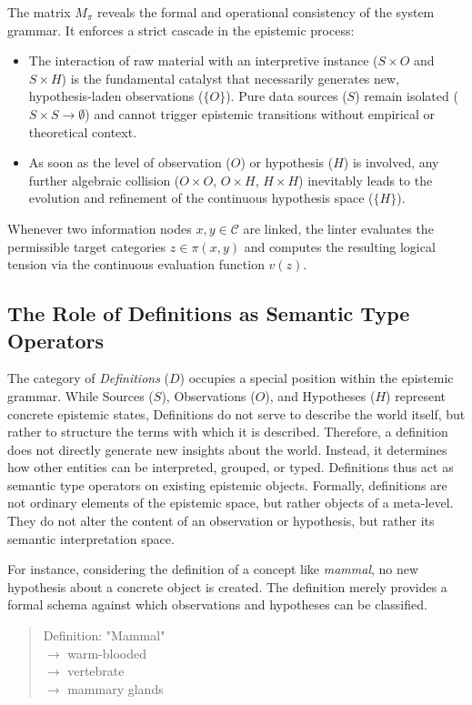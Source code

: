 \documentclass[11pt, a4paper]{article}
\begin{document}
	The matrix $M_\pi$ reveals the formal and operational consistency of the system grammar. It enforces a strict cascade in the epistemic process: 
	\begin{itemize}
		\item The interaction of raw material with an interpretive instance ($S \times O$ and $S \times H$) is the fundamental catalyst that necessarily generates new, hypothesis-laden observations ($\{O\}$). Pure data sources ($S$) remain isolated ($S \times S \to \emptyset$) and cannot trigger epistemic transitions without empirical or theoretical context.
		\item As soon as the level of observation ($O$) or hypothesis ($H$) is involved, any further algebraic collision ($O \times O$, $O \times H$, $H \times H$) inevitably leads to the evolution and refinement of the continuous hypothesis space ($\{H\}$).
	\end{itemize}
	Whenever two information nodes $x, y \in \mathcal{C}$ are linked, the linter evaluates the permissible target categories $z \in \pi(x, y)$ and computes the resulting logical tension via the continuous evaluation function $v(z)$.
	
	\subsection{The Role of Definitions as Semantic Type Operators}
	
	The category of \emph{Definitions} ($D$) occupies a special position within the epistemic grammar. While Sources ($S$), Observations ($O$), and Hypotheses ($H$) represent concrete epistemic states, Definitions do not serve to describe the world itself, but rather to structure the terms with which it is described. Therefore, a definition does not directly generate new insights about the world. Instead, it determines how other entities can be interpreted, grouped, or typed. Definitions thus act as semantic type operators on existing epistemic objects. Formally, definitions are not ordinary elements of the epistemic space, but rather objects of a meta-level. They do not alter the content of an observation or hypothesis, but rather its semantic interpretation space.
	
	For instance, considering the definition of a concept like \emph{mammal}, no new hypothesis about a concrete object is created. The definition merely provides a formal schema against which observations and hypotheses can be classified.
	
	\begin{quote}
		Definition: "Mammal" \\
		\quad $\rightarrow$ warm-blooded \\
		\quad $\rightarrow$ vertebrate \\
		\quad $\rightarrow$ mammary glands
	\end{quote}
	
\end{document}
